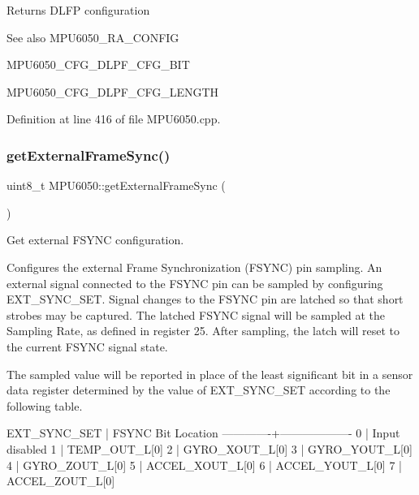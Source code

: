 \begin{DoxyReturn}{Returns}
D\+L\+FP configuration 
\end{DoxyReturn}
\begin{DoxySeeAlso}{See also}
M\+P\+U6050\+\_\+\+R\+A\+\_\+\+C\+O\+N\+F\+IG 

M\+P\+U6050\+\_\+\+C\+F\+G\+\_\+\+D\+L\+P\+F\+\_\+\+C\+F\+G\+\_\+\+B\+IT 

M\+P\+U6050\+\_\+\+C\+F\+G\+\_\+\+D\+L\+P\+F\+\_\+\+C\+F\+G\+\_\+\+L\+E\+N\+G\+TH 
\end{DoxySeeAlso}


Definition at line 416 of file M\+P\+U6050.\+cpp.

\mbox{\label{classMPU6050_a902a7d486cd6ac21f8c378634dc6f59a}} 
\subsubsection{\texorpdfstring{getExternalFrameSync()}{getExternalFrameSync()}}
{\footnotesize\ttfamily uint8\+\_\+t M\+P\+U6050\+::get\+External\+Frame\+Sync (\begin{DoxyParamCaption}{ }\end{DoxyParamCaption})}



Get external F\+S\+Y\+NC configuration. 

Configures the external Frame Synchronization (F\+S\+Y\+NC) pin sampling. An external signal connected to the F\+S\+Y\+NC pin can be sampled by configuring E\+X\+T\+\_\+\+S\+Y\+N\+C\+\_\+\+S\+ET. Signal changes to the F\+S\+Y\+NC pin are latched so that short strobes may be captured. The latched F\+S\+Y\+NC signal will be sampled at the Sampling Rate, as defined in register 25. After sampling, the latch will reset to the current F\+S\+Y\+NC signal state.

The sampled value will be reported in place of the least significant bit in a sensor data register determined by the value of E\+X\+T\+\_\+\+S\+Y\+N\+C\+\_\+\+S\+ET according to the following table.


\begin{DoxyPre}
EXT\_SYNC\_SET | FSYNC Bit Location
-------------+-------------------
0            | Input disabled
1            | TEMP\_OUT\_L[0]
2            | GYRO\_XOUT\_L[0]
3            | GYRO\_YOUT\_L[0]
4            | GYRO\_ZOUT\_L[0]
5            | ACCEL\_XOUT\_L[0]
6            | ACCEL\_YOUT\_L[0]
7            | ACCEL\_ZOUT\_L[0]
\end{DoxyPre}


